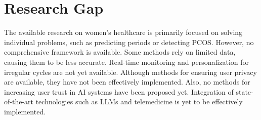 \section{Research Gap}

The available research on women's healthcare is primarily focused on solving individual problems, such as predicting periods or detecting PCOS. \cite{dataset} However, no comprehensive framework is available. Some methods rely on limited data, causing them to be less accurate. Real-time monitoring and personalization for irregular cycles are not yet available. Although methods for ensuring user privacy are available, they have not been effectively implemented. Also, no methods for increasing user trust in AI systems have been proposed yet. Integration of state-of-the-art technologies such as LLMs and telemedicine is yet to be effectively implemented.